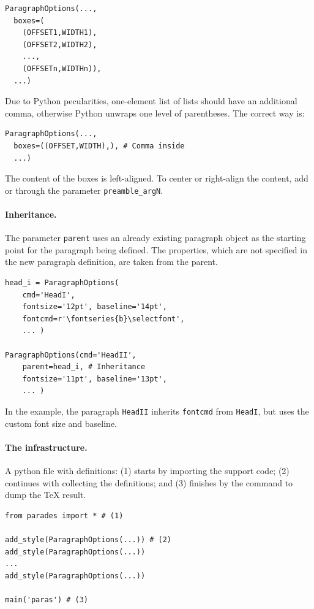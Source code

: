 \documentclass[]{ltugboat}
\begin{document}
\begin{verbatim}
ParagraphOptions(...,
  boxes=(
    (OFFSET1,WIDTH1),
    (OFFSET2,WIDTH2),
    ...,
    (OFFSETn,WIDTHn)),
  ...)
\end{verbatim}

Due to Python pecularities, one-element list of lists should have an additional comma, otherwise Python unwraps one level of parentheses. The correct way is:

\begin{verbatim}
ParagraphOptions(...,
  boxes=((OFFSET,WIDTH),), # Comma inside
  ...)
\end{verbatim}

The content of the boxes is left-aligned. To center or right-align the content, add  or  through the parameter \verb|preamble_argN|.

\paragraph{Inheritance.} The parameter \verb|parent| uses an already existing paragraph object as the starting point for the paragraph being defined. The properties, which are not specified in the new paragraph definition, are taken from the parent.

\begin{verbatim}
head_i = ParagraphOptions(
    cmd='HeadI',
    fontsize='12pt', baseline='14pt',
    fontcmd=r'\fontseries{b}\selectfont',
    ... )

ParagraphOptions(cmd='HeadII',
    parent=head_i, # Inheritance
    fontsize='11pt', baseline='13pt',
    ... )
\end{verbatim}

In the example, the paragraph \verb|HeadII| inherits \verb|fontcmd| from \verb|HeadI|, but uses the custom font size and baseline.

\paragraph{The infrastructure.} A python file with definitions: (1) starts by importing the support code; (2) continues with collecting the definitions; and (3) finishes by the command to dump the \TeX{} result.

\begin{verbatim}
from parades import * # (1)

add_style(ParagraphOptions(...)) # (2)
add_style(ParagraphOptions(...))
...
add_style(ParagraphOptions(...))

main('paras') # (3)
\end{verbatim}
\end{document}
